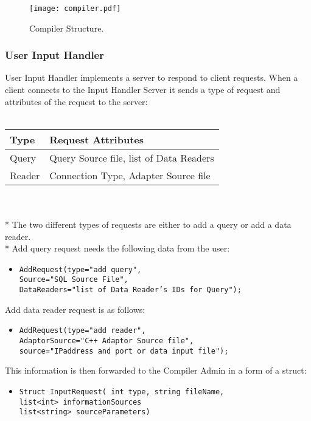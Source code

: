 \documentclass[11pt]{article}
\begin{document}
\begin{figure}
  \texttt{[image: compiler.pdf]}
  \caption{Compiler Structure.}
  \label{CompilerPicture}
\end{figure}

\subsubsection{User Input Handler}
User Input Handler implements a server to respond to client requests. When a client connects to the Input Handler Server it sends a type of request and attributes of the request to the server:
\\
\\
\begin{tabular}{|l|l|}
  \hline
  Type & Request Attributes \\ \hline
  Query & Query Source file, list of Data Readers \\ \hline
  Reader & Connection Type, Adapter Source file \\ \hline
\end{tabular}
\\
\\*
The two different types of requests are either to add a query or add a data reader.
\\*
Add query request needs the following data from the user:

\begin{itemize}
	\item {\tt AddRequest(type="add query",\\
		 Source="SQL Source File",\\
	     DataReaders="list of Data Reader's IDs for Query");}
\end{itemize}

\noindent Add data reader request is as follows:

\begin{itemize}
	\item {\tt AddRequest(type="add reader", \\
	     AdaptorSource="C++ Adaptor Source file",\\
	     source="IPaddress and port or data input file");}
\end{itemize}

This information is then forwarded to the Compiler Admin in a form of a struct:

\begin{itemize}
	\item {\tt Struct InputRequest( int type, string fileName,\\
	       list<int> informationSources \\
		   list<string> sourceParameters)}
\end{itemize}
\end{document}
